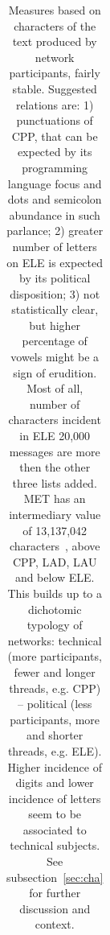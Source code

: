 \documentclass[%
 aip,
 jmp,%
 amsmath,amssymb,
 reprint,%
 floatfix,
]{revtex4-1}
\begin{document}
\begin{table}
\begin{tabular}{|l|| c|c|c|c||  c|c|c|c||   c|c|c|c||   c|c|c|c|}
  \end{tabular}
  \caption{Measures based on characters of the text produced by network participants, fairly stable. Suggested relations are: 1) punctuations of CPP, that can be expected by its programming language focus and dots and semicolon abundance in such parlance; 2) greater number of letters on ELE is expected by its political disposition; 3) not statistically clear, but higher percentage of vowels might be a sign of erudition. Most of all, number of characters incident in ELE 20,000 messages are more then the other three lists added. MET has an intermediary value of 13,137,042 characters~\cite{evoSN}, above CPP, LAD, LAU and below ELE. This builds up to a dichotomic typology of networks: technical (more participants, fewer and longer threads, e.g. CPP) -- political (less participants, more and shorter threads, e.g. ELE). Higher incidence of digits and lower incidence of letters seem to be associated to technical subjects. See subsection~\ref{sec:cha} for further discussion and context.}
  \label{tab:cha}
\end{table}
\end{document}
